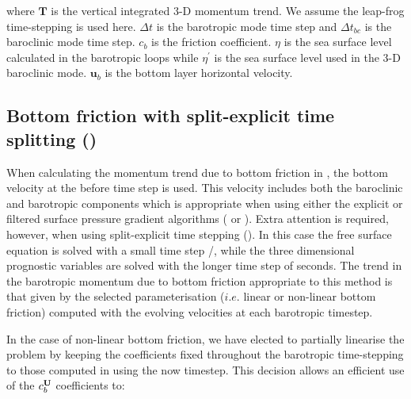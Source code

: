 \documentclass[../main/NEMO_manual]{subfiles}
\begin{document}
where $\textbf{T}$ is the vertical integrated 3-D momentum trend.
We assume the leap-frog time-stepping is used here.
$\Delta t$ is the barotropic mode time step and $\Delta t_{bc}$ is the baroclinic mode time step.
$c_{b}$ is the friction coefficient.
$\eta$ is the sea surface level calculated in the barotropic loops while $\eta^{'}$ is the sea surface level used in
the 3-D baroclinic mode.
$\textbf{u}_{b}$ is the bottom layer horizontal velocity.

\subsection[Bottom friction w/ split-explicit time splitting (\protect\np{ln\_bfrimp})]
				{Bottom friction with split-explicit time splitting (\protect{})}
\label{subsec:ZDF_bfr_ts}

When calculating the momentum trend due to bottom friction in ,
the bottom velocity at the before time step is used.
This velocity includes both the baroclinic and barotropic components which is appropriate when
using either the explicit or filtered surface pressure gradient algorithms
( or ).
Extra attention is required, however, when using split-explicit time stepping ().
In this case the free surface equation is solved with a small time step /,
while the three dimensional prognostic variables are solved with the longer time step of  seconds.
The trend in the barotropic momentum due to bottom friction appropriate to this method is that given by
the selected parameterisation ($i.e.$ linear or non-linear bottom friction) computed with
the evolving velocities at each barotropic timestep. 

In the case of non-linear bottom friction, we have elected to partially linearise the problem by
keeping the coefficients fixed throughout the barotropic time-stepping to those computed in
 using the now timestep.
This decision allows an efficient use of the $c_b^{\mathbf{U}}$ coefficients to:
\end{document}

